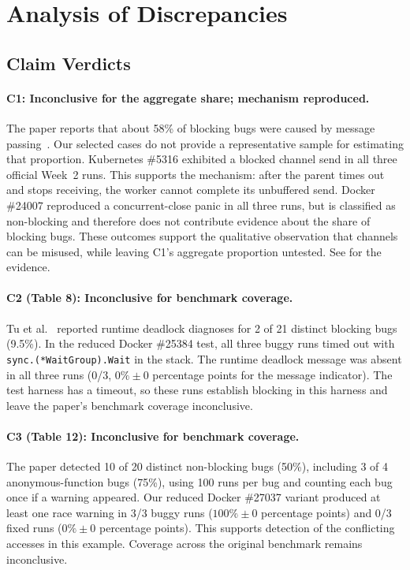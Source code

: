 \section{Analysis of Discrepancies}
\label{sec:analysis}

\subsection{Claim Verdicts}
\paragraph{C1: Inconclusive for the aggregate share; mechanism reproduced.}
The paper reports that about 58\% of blocking bugs were caused by
message passing~\cite{tu2019go}. Our selected cases do not provide a
representative sample for estimating that proportion.
Kubernetes \#5316 exhibited a blocked channel send in all three
official Week~2 runs. This supports the mechanism: after the parent
times out and stops receiving, the worker cannot complete its
unbuffered send. Docker \#24007 reproduced a concurrent-close panic
in all three runs, but is classified as non-blocking and therefore
does not contribute evidence about the share of blocking bugs.
These outcomes support the qualitative observation that channels
can be misused, while leaving C1's aggregate proportion untested.
See  for the evidence.

\paragraph{C2 (Table 8): Inconclusive for benchmark coverage.}
Tu et al.~\cite{tu2019go} reported runtime deadlock diagnoses for 2 of 21
distinct blocking bugs (9.5\%). In the reduced Docker \#25384 test, all three
buggy runs timed out with \texttt{sync.(*WaitGroup).Wait} in the stack. The
runtime deadlock message was absent in all three runs (0/3,
$0\% \pm 0$ percentage points for the message indicator). The test
harness has a timeout, so these runs establish blocking in this
harness and leave the paper's benchmark coverage inconclusive.

\paragraph{C3 (Table 12): Inconclusive for benchmark coverage.}
The paper detected 10 of 20 distinct non-blocking bugs (50\%), including
3 of 4 anonymous-function bugs (75\%), using 100 runs per bug and counting
each bug once if a warning appeared. Our reduced Docker \#27037 variant
produced at least one race warning in 3/3 buggy runs
($100\% \pm 0$ percentage points) and 0/3 fixed runs
($0\% \pm 0$ percentage points). This supports detection of the
conflicting accesses in this example. Coverage across the original
benchmark remains inconclusive.

